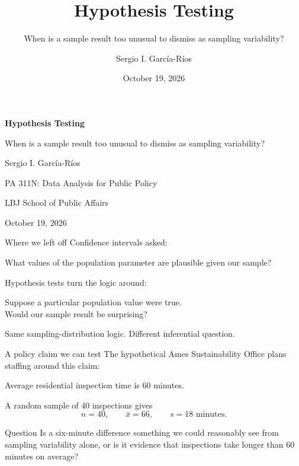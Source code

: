\documentclass[11pt,aspectratio=169]{beamer}
\author{Sergio I. Garc\'ia-R\'ios}
\title{Hypothesis Testing}
\subtitle{When is a sample result too unusual to dismiss as sampling variability?}
\institute{PA 311N: Data Analysis for Public Policy\\LBJ School of Public Affairs}
\date{October 19, 2026}
\begin{document}
\begin{frame}[plain]
\centering
\vspace{0.55cm}
{\color{LBJnavy}\LARGE\bfseries Hypothesis Testing\par}
\vspace{0.35cm}
{\large When is a sample result too unusual to dismiss as sampling variability?\par}
\vspace{0.8cm}
{\normalsize Sergio I. Garc\'ia-R\'ios\par}
\vspace{0.2cm}
{\small PA 311N: Data Analysis for Public Policy\par}
{\small LBJ School of Public Affairs\par}
\vfill
{\small October 19, 2026\par}
\end{frame}

\begin{frame}{Where we left off}
Confidence intervals asked:
\begin{center}
\Large What values of the population parameter are \alert{plausible} given our sample?
\end{center}

\vspace{0.8em}
Hypothesis tests turn the logic around:
\begin{center}
\Large Suppose a particular population value were true.\\
Would our sample result be \alert{surprising}?
\end{center}

\vfill
Same sampling-distribution logic. Different inferential question.
\end{frame}

\begin{frame}{A policy claim we can test}
The hypothetical Ames Sustainability Office plans staffing around this claim:

\begin{center}
\Large Average residential inspection time is \alert{60 minutes}.
\end{center}

A random sample of 40 inspections gives
\[
n=40,\qquad \bar{x}=66,\qquad s=18\text{ minutes}.
\]

\vfill
\begin{alertblock}{Question}
Is a six-minute difference something we could reasonably see from sampling variability alone, or is it evidence that inspections take longer than 60 minutes on average?
\end{alertblock}
\end{frame}
\end{document}
